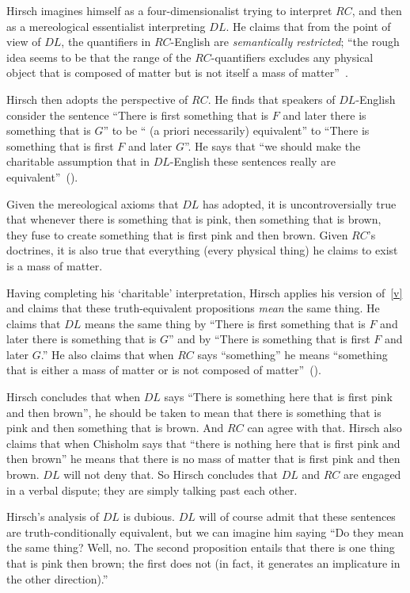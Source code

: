 \documentclass[11pt]{article}
\begin{document}
\begin{spacing}{1.25}
Hirsch imagines himself as a four-dimensionalist trying to interpret
$RC$, and then as a mereological essentialist interpreting $DL$.  He
claims that from the point of view of $DL$, the quantifiers in
$RC$-English are {\em semantically restricted}; ``the rough idea seems
to be that the range of the $RC$-quantifiers excludes any physical
object that is composed of matter but is not itself a mass of
matter''~\citep[76]{hirsch2005}.

Hirsch then adopts the perspective of $RC$.  He finds that speakers of
$DL$-English consider the sentence ``There is first something that is
$F$ and later there is something that is $G$'' to be `` (a priori
necessarily) equivalent'' to ``There is something that is first $F$
and later $G$''.  He says that ``we should make the charitable
assumption that in $DL$-English these sentences really are
equivalent''~(\citeyear[78]{hirsch2005}).

Given the mereological axioms that $DL$ has adopted, it is
uncontroversially true that whenever there is something that is pink,
then something that is brown, they fuse to create something that is
first pink and then brown.  Given $RC$'s doctrines, it is also
true that everything (every physical thing) he claims to exist is a
mass of matter.

Having completing his `charitable' interpretation, Hirsch applies his
version of~\ref{v} and claims that these truth-equivalent propositions
{\em mean} the same thing.  He claims that $DL$ means the same thing
by ``There is first something that is $F$ and later there is something
that is $G$'' and by ``There is something that is first $F$ and later
$G$.''  He also claims that when $RC$ says ``something'' he means
``something that is either a mass of matter or is not composed of
matter''~(\citeyear[76]{hirsch2005}).

Hirsch concludes that when $DL$ says ``There is something here that is
first pink and then brown'', he should be taken to mean that there is
something that is pink and then something that is brown.  And $RC$ can
agree with that.  Hirsch also claims that when Chisholm says that
``there is nothing here that is first pink and then brown'' he means
that there is no mass of matter that is first pink and then
brown.  $DL$ will not deny that.  So Hirsch concludes that $DL$ and
$RC$ are engaged in a verbal dispute; they are simply talking past
each other.

Hirsch's analysis of $DL$ is dubious.  $DL$ will of course admit that
these sentences are truth-conditionally equivalent, but we can imagine
him saying ``Do they mean the same thing?  Well, no.  The second
proposition entails that there is one thing that is pink then brown;
the first does not (in fact, it generates an implicature in the other
direction).''


\end{spacing}
\end{document}

